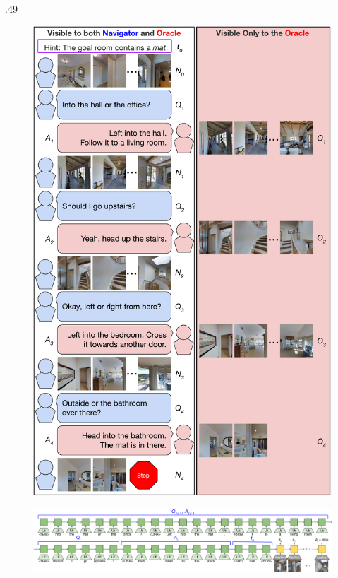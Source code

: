 \documentclass[final]{beamer}
\newcommand{\setblocksize}{\LARGE \centering}
\newcommand{\centercolumnwidth}{.49}
\begin{document}
\begin{frame}{}
\begin{columns}[t]
\begin{column}{\centercolumnwidth\linewidth}
\begin{block}{\setblocksize }
{\begin{figure}[!t]
  \centering
  \includegraphics[width=0.95\linewidth]{figures/full_demo_vertical.pdf}
\end{figure}

\begin{figure}
  \centering
  \includegraphics[width=\linewidth]{figures/model.pdf}    
\end{figure}

}
\end{block}


\end{column}
\end{columns}
\end{frame}
\end{document}
